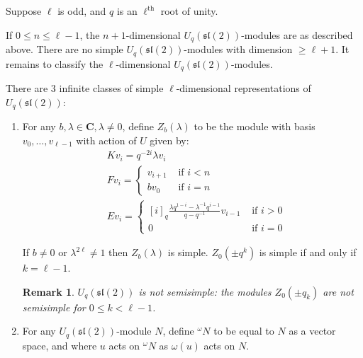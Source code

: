 \documentclass[]{article}
\newtheorem{remark}{Remark}
\begin{document}

Suppose $\ell$ is odd, and $q$ is an $\ell^{\text{th}}$ root of unity. 

If $0 \leq n \leq \ell - 1$, the $n+1$-dimensional
$U_q(\mathfrak{sl}(2))$-modules are as described above. %
There are no simple $U_q(\mathfrak{sl}(2))$-modules with dimension $\geq
\ell+1$. It remains to classify the $\ell$-dimensional
$U_q(\mathfrak{sl}(2))$-modules.

There are $3$ infinite classes of simple $\ell$-dimensional representations of  $U_q(\mathfrak{sl}(2))$:
\begin{enumerate}
        \item For any $b,\lambda \in \mathbf{C}, \lambda \neq 0$, define
            $Z_b(\lambda)$ to be the module with basis $v_0, \ldots, v_{\ell -
            1}$ with action of $U$ given by: 
\begin{align*}
    &K v_i = q^{-2i} \lambda v_i \\
    &F v_i = \begin{cases} v_{i+1}& \text{ if $i < n$} \\  b v_0& \text{ if $i = n$} \end{cases}  \\
    &E v_i = \begin{cases} 
        [i]_q \frac{\lambda q^{1-i} - \lambda^{-1} q^{i-1}}{q - q^{-1}} v_{i-1}& \text{ if $i > 0$} \\ 
                    0& \text{ if $i = 0$} 
             \end{cases} 
\end{align*}

If $b \neq 0$ or $\lambda^{2\ell}\neq 1$ then $Z_b(\lambda)$ is simple.
$Z_0(\pm q^k)$ is simple if and only if $k = \ell - 1$. 

\begin{remark}
    $U_q(\mathfrak{sl}(2))$ is not semisimple: the modules $Z_0(\pm q_k)$ are not semisimple for $0 \leq k < \ell - 1$.
\end{remark}
\item For any $U_q(\mathfrak{sl}(2))$-module $N$, define $^\omega N$ to be
    equal to $N$ as a vector space, and where $u$ acts on $^\omega N$ as
    $\omega(u)$ acts on $N$.


\end{enumerate}
\end{document}
